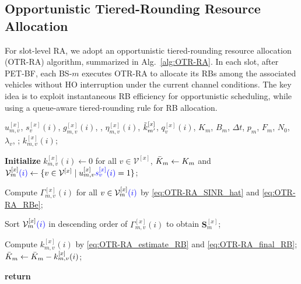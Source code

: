 \documentclass[10pt,journal,letterpaper]{journal_template/IEEEtran}
\newcommand{\rev}[1]{\textcolor{revisioncolor}{{}#1}}
\newif\ifshowdeletions
\newcommand{\currentdel}[1]{\ifshowdeletions\textcolor{deletioncolor}{\sout{#1}}\fi}
\theoremstyle{remark}
\begin{document}
\subsection{Opportunistic Tiered-Rounding Resource Allocation}
\label{subsection:OTR-RA strategy}

For slot-level RA, we adopt an opportunistic tiered-rounding resource allocation (OTR-RA) algorithm, summarized in Alg.~\ref{alg:OTR-RA}. In each slot, after PET-BF, each BS-$m$ executes OTR-RA to allocate its RBs among the associated vehicles\rev{ without HO interruption} under the current channel conditions. The key idea is to exploit instantaneous RB efficiency for opportunistic scheduling, while using a queue-aware tiered-rounding rule for RB allocation.

\begin{algorithm}[tbp]
    \caption{Opportunistic Tiered-Rounding Resource Allocation (OTR-RA)}
    \label{alg:OTR-RA}
    \renewcommand{\algorithmicrequire}{\textbf{Input:}}
    \renewcommand{\algorithmicensure}{\textbf{Output:}}
    \begin{algorithmic}[1]
        \REQUIRE
        $u_{m,v}^{[x]}$, \rev{$s_v^{[x]}(i)$, }$g_{m,v}^{[x]}(i)$, \currentdel{$g_{{\rm I},m',v}^{[x]}(i)$}, $\eta_{m,v}^{[x]}(i)$,
        $\Tilde{k}_{m'}^{[x]}$, $q_v^{[x]}(i)$, $K_m$, $B_m$, $\Delta t$,
        $p_m$, $F_m$, $N_0$, $\lambda_v$, \currentdel{$\tau_{\rm th}$};
        \ENSURE
        $k_{m,v}^{[x]}(i)$;

        \STATE \textbf{Initialize} \rev{$k_{m,v}^{[x]}(i)\gets 0$ for all $v\in\mathcal{V}^{[x]}$, }$\Bar{K}_m \gets K_m$ and
               $\mathcal{V}_m^{[x]}\rev{(i)} \gets \{ v \in \mathcal{V}^{[x]} \mid u_{m,v}^{[x]}\rev{s_v^{[x]}(i)} = 1 \}$;

        \STATE Compute $\Gamma_{m,v}^{[x]}(i)$ for all $v \in \mathcal{V}_m^{[x]}\rev{(i)}$ by \eqref{eq:OTR-RA_SINR_hat} and \eqref{eq:OTR-RA_RBe};

        \STATE Sort $\mathcal{V}_m^{[x]}\rev{(i)}$ in descending order of $\Gamma_{m,v}^{[x]}(i)$
               to obtain $\bm{S}_m^{[x]}$;

            \STATE Compute $k_{m,v}^{[x]}(i)$ by \eqref{eq:OTR-RA_estimate_RB} and \eqref{eq:OTR-RA_final_RB};
            \STATE $\Bar{K}_m \gets \Bar{K}_m - k_{m,v}^{[x]}(i)$;
        \ENDFOR

        \STATE \textbf{return}
    \end{algorithmic}
\end{algorithm}
\end{document}
